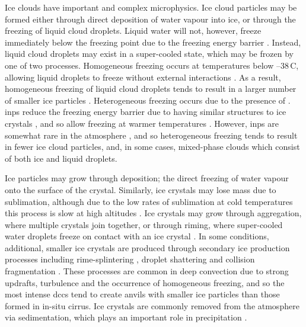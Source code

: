 Ice clouds have important and complex microphysics.
Ice cloud particles may be formed either through direct deposition of water vapour into ice, or through the freezing of liquid cloud droplets.
Liquid water will not, however, freeze immediately below the freezing point due to the freezing energy barrier \citep{heymsfield_homogeneous_1993}.
Instead, liquid cloud droplets may exist in a super-cooled state, which may be frozen by one of two processes.
Homogeneous freezing occurs at temperatures below --38\,\textdegree C, allowing liquid droplets to freeze without external interactions \citep{koop_water_2000}.
As a result, homogeneous freezing of liquid cloud droplets tends to result in a larger number of smaller ice particles \citep{karcher_parameterization_2002, ickes_classical_2015}.
Heterogeneous freezing occurs due to the presence of  \citep{kanji_overview_2017a}.
\acrshort{inp}s reduce the freezing energy barrier due to having similar structures to ice crystals \citep{hoose_heterogeneous_2012}, and so allow freezing at warmer temperatures \citep{karcher_roles_2003}.
However, \acrshort{inp}s are somewhat rare in the atmosphere \citep{burrows_icenucleating_2022a}, and so heterogeneous freezing tends to result in fewer ice cloud particles, and, in some cases, mixed-phase clouds which consist of both ice and liquid droplets.

Ice particles may grow through deposition; the direct freezing of water vapour onto the surface of the crystal.
Similarly, ice crystals may lose mass due to sublimation, although due to the low rates of sublimation at cold temperatures this process is slow at high altitudes \citep{boehm_maintenance_1999, seeley_formation_2019}.
Ice crystals may grow through aggregation, where multiple crystals join together, or through riming, where super-cooled water droplets freeze on contact with an ice crystal \citep{ryan_growth_1976}.
In some conditions, additional, smaller ice crystals are produced through secondary ice production processes including rime-splintering \citep{hallett_production_1974}, droplet shattering and collision fragmentation \citep{field_secondary_2017a}.
These processes are common in deep convection due to strong updrafts, turbulence and the occurrence of homogeneous freezing, and so the most intense \acrshort{dcc}s tend to create anvils with smaller ice particles than those formed in in-situ cirrus.
Ice crystals are commonly removed from the atmosphere via sedimentation, which plays an important role in precipitation \citep{mulmenstadt_frequency_2015}.

